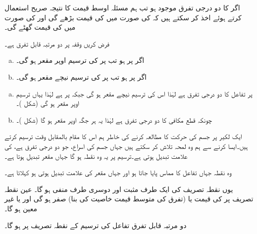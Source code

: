اگر  کا دو درجی تفرق موجود ہو تب ہم مسئلہ اوسط قیمت کا نتیجہ صریح  استعمال کرتے ہوئے اخذ کر سکتے ہیں کہ  کی صورت میں  کی قیمت بڑھے گی اور  کی صورت میں  کی قیمت گھٹے گی۔ 


فرض کریں وقفہ  پر  دو مرتبہ قابل تفرق ہے۔
\begin{enumerate}[a.]
\item
اگر  پر  ہو تب  پر  کی ترسیم اوپر مقعر ہو گی۔
\item
اگر  پر  ہو تب  پر  کی ترسیم نیچے مقعر ہو گی۔
\end{enumerate}

\begin{enumerate}[a.]
\item
{} پر تفاعل  کا دو درجی تفرق  ہے  لہٰذا اس کی ترسیم نیچے مقعر ہو گی جبکہ  پر  ہے لہٰذا یہاں ترسیم اوپر مقعر ہو گی (شکل )۔
\item
چونکہ قطع مکافی  کا دو درجی تفرق  ہے لہٰذا یہ ہر جگہ اوپر مقعر ہو گا (شکل )۔ 
\end{enumerate}
ایک لکیر پر جسم کی حرکت کا مطالعہ کرنے کی خاطر ہم اس کا مقام بالمقابل وقت ترسیم کرتے ہیں۔ایسا کرنے سے ہم وہ لمحہ تلاش کر سکتے  ہیں جہاں جسم کی اسراع، جو دو درجی تفرق ہے، کی علامت تبدیل ہوتی ہے۔ترسیم پر یہ وہ نقطہ ہو گا جہاں مقعر تبدیل ہوتا ہے۔

وہ نقطہ جہاں تفاعل کا مماس پایا جاتا ہو اور جہاں مقعر کی علامت تبدیل ہوتی ہو  کہلاتا ہے۔

یوں نقطہ تصریف کی ایک طرف  مثبت اور دوسری طرف منفی ہو گا۔ عین نقطہ تصریف پر  کی قیمت یا (تفرق کی متوسط قیمت خاصیت کی بنا) صفر ہو گی  اور یا  غیر معین ہو گا۔

دو مرتبہ قابل تفرق تفاعل کی ترسیم کے نقطہ تصریف پر  ہو گا۔

